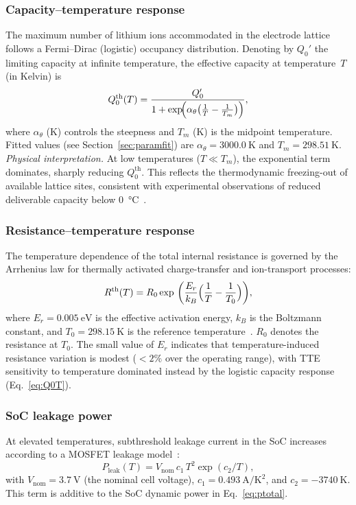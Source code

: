 \documentclass[5p,times,number]{elsarticle}
\newcommand{\secref}[1]{\textcolor{supercolor}{Section~\ref{#1}}}
\newcommand{\eqnref}[1]{\textcolor{supercolor}{Eq.~\eqref{#1}}}
\newcommand{\eqnrefp}[1]{\textcolor{supercolor}{Eq.~\ref{#1}}}
\begin{document}
\subsubsection{Capacity--temperature response}
The maximum number of lithium ions accommodated in the electrode lattice follows a Fermi--Dirac (logistic) occupancy distribution.
Denoting by $Q_0'$ the limiting capacity at infinite temperature, the effective capacity at temperature~$T$ (in Kelvin) is
\begin{equation}\label{eq:Q0T}
Q_0^{\mathrm{th}}(T) = \frac{Q_0'}{1 + \exp\!\Bigl(\alpha_\theta\bigl(\tfrac{1}{T} - \tfrac{1}{T_m}\bigr)\Bigr)},
\end{equation}
where $\alpha_\theta$ (K) controls the steepness and $T_m$ (K) is the midpoint temperature.
Fitted values (see \secref{sec:paramfit}) are $\alpha_\theta = \SI{3000.0}{\kelvin}$ and $T_m = \SI{298.51}{\kelvin}$.
\emph{Physical interpretation.}
At low temperatures ($T \ll T_m$), the exponential term dominates, sharply reducing $Q_0^{\mathrm{th}}$.
This reflects the thermodynamic freezing-out of available lattice sites, consistent with experimental observations of reduced deliverable capacity below \SI{0}{\degreeCelsius}~\cite{Ali2020}.

\subsubsection{Resistance--temperature response}
The temperature dependence of the total internal resistance is governed by the Arrhenius law for thermally activated charge-transfer and ion-transport processes:
\begin{equation}\label{eq:RT}
R^{\mathrm{th}}(T) = R_0\exp\ \biggl(\frac{E_r}{k_B}\Bigl(\frac{1}{T} - \frac{1}{T_0}\Bigr)\biggr),
\end{equation}
where $E_r = \SI{0.005}{\electronvolt}$ is the effective activation energy, $k_B$ is the Boltzmann constant, and $T_0 = \SI{298.15}{\kelvin}$ is the reference temperature~\cite{Whittingham2012,He2017,Jeon2011ECM}.
$R_0$ denotes the resistance at $T_0$.
The small value of $E_r$ indicates that temperature-induced resistance variation is modest ($<2\%$ over the operating range), with TTE sensitivity to temperature dominated instead by the logistic capacity response (\eqnrefp{eq:Q0T}).

\subsubsection{SoC leakage power}
At elevated temperatures, subthreshold leakage current in the SoC increases according to a MOSFET leakage model~\cite{Bhat2019,Bhat2021}:
\begin{equation}\label{eq:leak}
P_{\mathrm{leak}}(T) = V_{\mathrm{nom}}\,c_1\,T^2\exp(c_2 / T),
\end{equation}
with $V_{\mathrm{nom}} = \SI{3.7}{\volt}$ (the nominal cell voltage), $c_1 = \SI{0.493}{\ampere\per\kelvin\squared}$, and $c_2 = \SI{-3740}{\kelvin}$.
This term is additive to the SoC dynamic power in \eqnref{eq:ptotal}.
\end{document}
